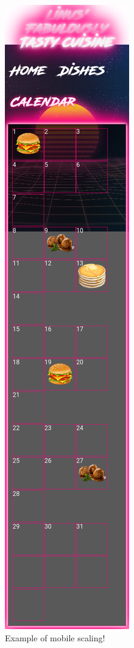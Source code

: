 \documentclass[a4paper]{scrartcl}
\begin{document}
\begin{figure}[H]
  \begin{center}
    \includegraphics[scale=0.35]{Scr4.png}
    \caption{Example of mobile scaling!}
    \label{fig:recipe}
  \end{center}
\end{figure}
\end{document}
